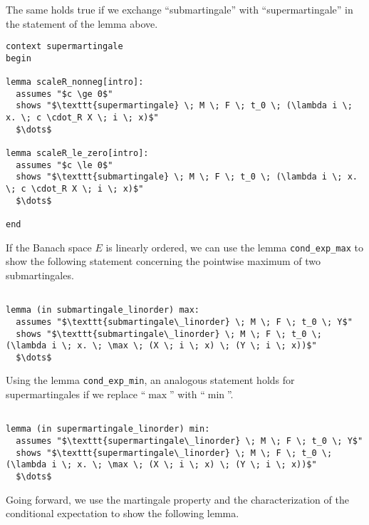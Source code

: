 The same holds true if we exchange ``submartingale'' with ``supermartingale'' in the statement of the lemma above.

\begin{isalemma}
{\small
\begin{lstlisting}[style=isabelle]
context supermartingale
begin

lemma scaleR_nonneg[intro]:
  assumes "$c \ge 0$"
  shows "$\texttt{supermartingale} \; M \; F \; t_0 \; (\lambda i \; x. \; c \cdot_R X \; i \; x)$"
  $\dots$

lemma scaleR_le_zero[intro]:
  assumes "$c \le 0$"
  shows "$\texttt{submartingale} \; M \; F \; t_0 \; (\lambda i \; x. \; c \cdot_R X \; i \; x)$"
  $\dots$

end
\end{lstlisting}
}
\end{isalemma}

If the Banach space $E$ is linearly ordered, we can use the lemma \texttt{cond\_exp\_max} to show the following statement concerning the pointwise maximum of two submartingales.

\begin{isalemma}
{\small
\begin{lstlisting}[style=isabelle]

lemma (in submartingale_linorder) max:
  assumes "$\texttt{submartingale\_linorder} \; M \; F \; t_0 \; Y$"
  shows "$\texttt{submartingale\_linorder} \; M \; F \; t_0 \; (\lambda i \; x. \; \max \; (X \; i \; x) \; (Y \; i \; x))$"
  $\dots$
\end{lstlisting}
}
\end{isalemma}

Using the lemma \texttt{cond\_exp\_min}, an analogous statement holds for supermartingales if we replace ``$\max$'' with ``$\min$''.

\begin{isalemma}
{\small
\begin{lstlisting}[style=isabelle]

lemma (in supermartingale_linorder) min:
  assumes "$\texttt{supermartingale\_linorder} \; M \; F \; t_0 \; Y$"
  shows "$\texttt{supermartingale\_linorder} \; M \; F \; t_0 \; (\lambda i \; x. \; \max \; (X \; i \; x) \; (Y \; i \; x))$"
  $\dots$
\end{lstlisting}
}
\end{isalemma}

Going forward, we use the martingale property and the characterization of the conditional expectation to show the following lemma.

